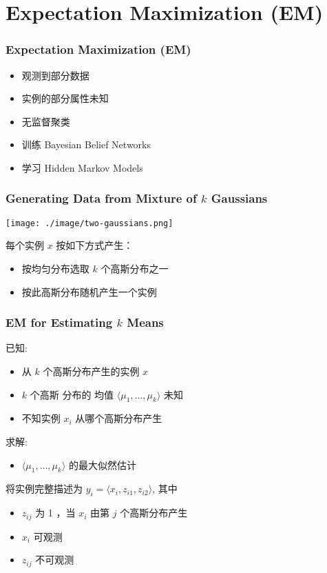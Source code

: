 \documentclass{beamer}
\begin{document}
\section{Expectation Maximization (EM)}
\label{sec-11}
\begin{frame}
\frametitle{Expectation Maximization (EM)}
\label{sec-11-1}

\begin{itemize}
\item 观测到部分数据
\item 实例的部分属性未知
\item 无监督聚类
\item 训练 Bayesian Belief Networks
\item 学习 Hidden Markov Models
\end{itemize}
\end{frame}
\begin{frame}
\frametitle{Generating Data from Mixture of $k$ Gaussians}
\label{sec-11-2}


\texttt{[image: ./image/two-gaussians.png]}


每个实例 $x$ 按如下方式产生：
\begin{itemize}
\item 按均匀分布选取 $k$ 个高斯分布之一
\item 按此高斯分布随机产生一个实例
\end{itemize}
\end{frame}
\begin{frame}
\frametitle{EM for Estimating $k$ Means}
\label{sec-11-3}


已知:
\begin{itemize}
\item 从 $k$ 个高斯分布产生的实例 $x$
\item $k$ 个高斯 分布的 均值 $\langle \mu_1, \ldots, \mu_k \rangle$ 未知
\item 不知实例 $x_i$ 从哪个高斯分布产生
\end{itemize}

求解:
\begin{itemize}
\item $\langle \mu_1, \ldots, \mu_k \rangle$ 的最大似然估计
\end{itemize}

将实例完整描述为 $y_i = \langle x_i, z_{i1}, z_{i2}\rangle$, 其中
\begin{itemize}
\item $z_{ij}$ 为 1 ，当 $x_i$ 由第 $j$ 个高斯分布产生
\item $x_i$ 可观测
\item $z_{ij}$ 不可观测
\end{itemize}
\end{frame}
\end{document}
